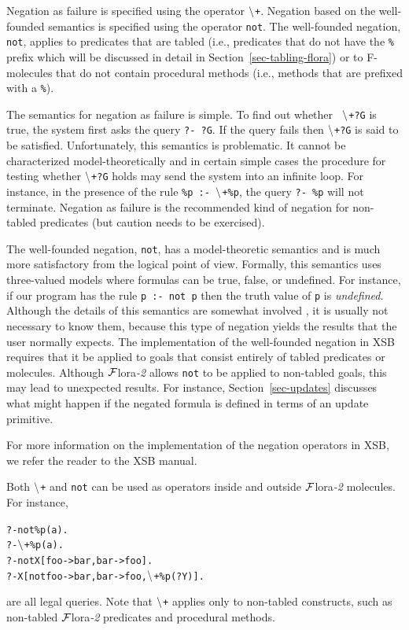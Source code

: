 \documentclass[11pt]{article}
\newcommand{\FLORA}{{\mbox{\sc ${\cal F}${lora}\rm\emph{-2}}}\xspace}
\newcommand{\NAF}{\mbox{\tt \ensuremath{\tt\backslash}+}\xspace}
\newcommand{\TNOT}{{{\tt not}}\xspace}
\begin{document}
Negation as failure is specified using the operator \NAF.
Negation based on the well-founded semantics is specified using the
operator \TNOT.  The well-founded negation, \TNOT, applies to predicates
that are tabled (i.e., predicates that do not have the {\tt \%} prefix
which will be discussed in detail in Section~\ref{sec-tabling-flora}) or
to F-molecules that do not contain procedural methods (i.e., methods that
are prefixed with a {\tt \%}).

The semantics for negation as failure is simple. To find out whether {\tt
  \NAF ?G} is true, the system first asks the query {\tt ?- ?G}. If the query
fails then {\tt \NAF ?G} is said to be satisfied. Unfortunately, this
semantics is problematic. It cannot be characterized model-theoretically
and in certain simple cases the procedure for testing whether {\tt \NAF ?G}
holds may send the system into an infinite loop. For instance, in the
presence of the rule {\tt \%p :- \NAF \%p}, the query {\tt ?- \%p} will not
terminate.  Negation as failure is the recommended kind of negation for
non-tabled predicates (but caution needs to be exercised).

The well-founded negation, \TNOT, has a model-theoretic semantics and is
much more
satisfactory from the logical point of view.
Formally, this semantics uses three-valued models where formulas can be
true, false, or undefined. For instance, if our program has the rule
{\tt p :- \TNOT p} then the truth value of {\tt p} is \emph{undefined}.  
Although the details of this
semantics are somewhat involved \cite{gelder-ross-schlipf-91}, it is
usually not necessary to know them, because this type of negation yields
the results that the user normally expects. The implementation of
the well-founded negation in XSB requires that it be applied to goals that
consist entirely of tabled predicates or molecules.
Although \FLORA allows \TNOT to be applied to non-tabled goals,
this may lead to unexpected results.  For instance, 
Section~\ref{sec-updates} discusses what might happen if the
negated formula is defined in terms of an update primitive.

For more information on the implementation of the negation operators in
XSB, we refer the reader to the XSB manual.

Both \NAF and \TNOT can be used as operators inside and outside \FLORA
molecules. For instance,
\begin{alltt}
       ?- \TNOT \%p(a).
       ?- \NAF \%p(a).
       ?- \TNOT X[foo->bar, bar->foo].
       ?- X[\TNOT foo->bar, bar->foo, \NAF \%p(?Y)].
\end{alltt}
are all legal queries. Note that \NAF applies only to non-tabled
constructs, such as non-tabled \FLORA predicates and procedural methods.
\end{document}
